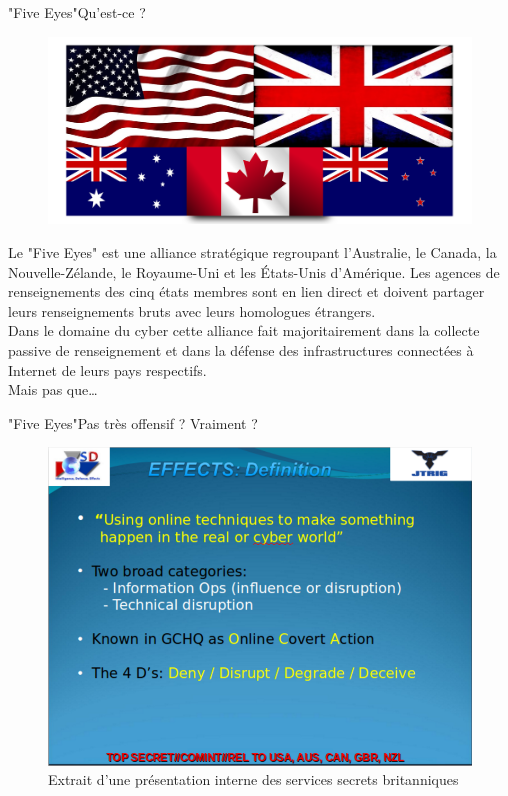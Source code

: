 \documentclass{beamer}
\begin{document}
\begin{frame}{"Five Eyes"}{Qu'est-ce ?}

    \begin{figure}[h]
        \includegraphics[scale=0.1]{FiveEyesFlags}
    \end{figure} 

Le "Five Eyes" est une alliance stratégique regroupant l'Australie, le Canada, la Nouvelle-Zélande, le Royaume-Uni et les États-Unis d'Amérique. Les agences de renseignements des cinq états membres sont en lien direct et doivent partager leurs renseignements bruts avec leurs homologues étrangers.\\
\vspace{10pt}
Dans le domaine du cyber cette alliance fait majoritairement dans la collecte passive de renseignement et dans la défense des infrastructures connectées à Internet de leurs pays respectifs.\\ 
Mais pas que\dots

\end{frame}

\begin{frame}{"Five Eyes"}{Pas très offensif ? Vraiment ?}
    
    \begin{figure}[h]
        \includegraphics[scale=0.25]{SlideOCA}
        \caption{\label{SlideOCA} Extrait d'une présentation interne des services secrets britanniques} 
    \end{figure} 

\end{frame}
\end{document}
